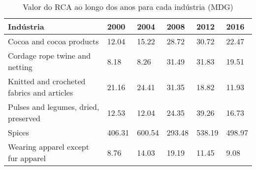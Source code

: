 \begin{table}
\centering
\caption{Valor do RCA ao longo dos anos para cada indústria (MDG)}
\begin{tabular}{p{6cm}p{1.5cm}p{1.5cm}p{1.5cm}p{1.5cm}p{1.5cm}}
\toprule
                                 Indústria &   2000 &   2004 &   2008 &   2012 &   2016 \\
\midrule
                  Cocoa and cocoa products &  12.04 &  15.22 &  28.72 &  30.72 &  22.47 \\
            Cordage rope twine and netting &   8.18 &   8.26 &  31.49 &  31.83 &  19.51 \\
Knitted and crocheted fabrics and articles &  21.16 &  24.41 &  31.35 &  18.82 &  11.93 \\
      Pulses and legumes, dried, preserved &  12.53 &  12.04 &  24.35 &  39.26 &  16.73 \\
                                    Spices & 406.31 & 600.54 & 293.48 & 538.19 & 498.97 \\
        Wearing apparel except fur apparel &   8.76 &  14.03 &  19.19 &  11.45 &   9.08 \\
\bottomrule
\end{tabular}
\end{table}
